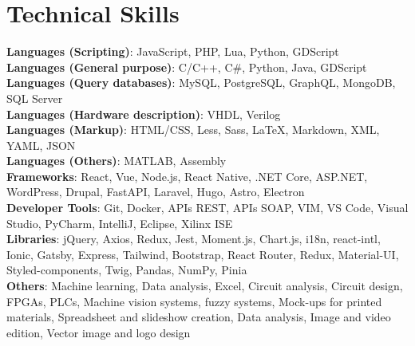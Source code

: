 \documentclass[letterpaper,11pt]{article}
\makeatletter
\newcommand{\resumeItem}[1]{
  \item\small{
    {#1 \vspace{-2pt}}
  }
}
\newcommand{\resumeProjectHeading}[2]{
    \item
    \begin{tabular*}{0.97\textwidth}{l@{\extracolsep{\fill}}r}
      \small#1 & #2 \\
    \end{tabular*}\vspace{-7pt}
}
\newcommand{\resumeSubHeadingListStart}{\begin{itemize}[leftmargin=0.15in, label={}]}
\newcommand{\resumeSubHeadingListEnd}{\end{itemize}}
\newcommand{\resumeItemListStart}{\begin{itemize}[leftmargin=0.15in]}
\newcommand{\resumeItemListEnd}{\end{itemize}\vspace{-5pt}}
\makeatother
\begin{document}

\section{Technical Skills}
\begin{itemize}[leftmargin=0.05in, label={}, itemsep=2pt, parsep=2pt]
  \small{\item{
    \textbf{Languages (Scripting)}{: JavaScript, PHP, Lua, Python, GDScript} \\
    \textbf{Languages (General purpose)}{: C/C++, C\#, Python, Java, GDScript} \\
    \textbf{Languages (Query databases)}{: MySQL, PostgreSQL, GraphQL, MongoDB, SQL Server} \\
    \textbf{Languages (Hardware description)}{: VHDL, Verilog} \\
    \textbf{Languages (Markup)}{: HTML/CSS, Less, Sass, LaTeX, Markdown, XML, YAML, JSON} \\
    \textbf{Languages (Others)}{: MATLAB, Assembly} \\
    \textbf{Frameworks}{: React, Vue, Node.js, React Native, .NET Core, ASP.NET, WordPress, Drupal, FastAPI, Laravel, Hugo, Astro, Electron} \\
    \textbf{Developer Tools}{: Git, Docker, APIs REST, APIs SOAP, VIM, VS Code, Visual Studio, PyCharm, IntelliJ, Eclipse, Xilinx ISE} \\
    \textbf{Libraries}{: jQuery, Axios, Redux, Jest, Moment.js, Chart.js, i18n, react-intl, Ionic, Gatsby, Express, Tailwind, Bootstrap, React Router, Redux, Material-UI, Styled-components, Twig, Pandas, NumPy, Pinia} \\
    \textbf{Others}{: Machine learning, Data analysis, Excel, Circuit analysis, Circuit design, FPGAs, PLCs, Machine vision systems, fuzzy systems, Mock-ups for printed materials, Spreadsheet and slideshow creation, Data analysis, Image and video edition, Vector image and logo design} \
  }}
\end{itemize}
\end{document}
